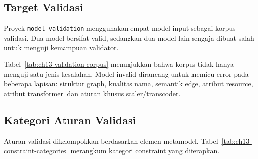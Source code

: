 \subsection{Target Validasi}

Proyek \texttt{model-validation} menggunakan empat model input sebagai korpus validasi. Dua model bersifat valid, sedangkan dua model lain sengaja dibuat salah untuk menguji kemampuan validator.

\begin{table}[h]
\centering
\caption{Korpus input pada proyek \texttt{model-validation}}
\label{tab:ch13-validation-corpus}
\footnotesize
{}
\normalsize
\end{table}

\noindent Tabel~\ref{tab:ch13-validation-corpus} menunjukkan bahwa korpus tidak hanya menguji satu jenis kesalahan. Model invalid dirancang untuk memicu error pada beberapa lapisan: struktur graph, kualitas nama, semantik edge, atribut resource, atribut transformer, dan aturan khusus scaler/transcoder.

\subsection{Kategori Aturan Validasi}

Aturan validasi dikelompokkan berdasarkan elemen metamodel. Tabel~\ref{tab:ch13-constraint-categories} merangkum kategori constraint yang diterapkan.

